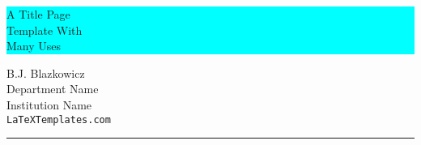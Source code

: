 %
%
%
% 



\colorbox{cyan}{
	\parbox[t]{0.93\textwidth}{ %
		\parbox[t]{0.91\textwidth}{ %
			\raggedleft %
			\fontsize{50pt}{80pt}\selectfont %
			\vspace{0.7cm} %
			
			A Title Page\\
			Template With\\
			Many Uses\\
			
			\vspace{0.7cm} %
		}
	}
}

\vfill %


\parbox[t]{0.93\textwidth}{ %
	\raggedleft %
	\large %
	{\Large B.J. Blazkowicz}\\[4pt] %
	Department Name\\
	Institution Name\\[4pt] %
	\texttt{LaTeXTemplates.com}\\
	
	\hfill\rule{0.2\linewidth}{1pt}%
}
